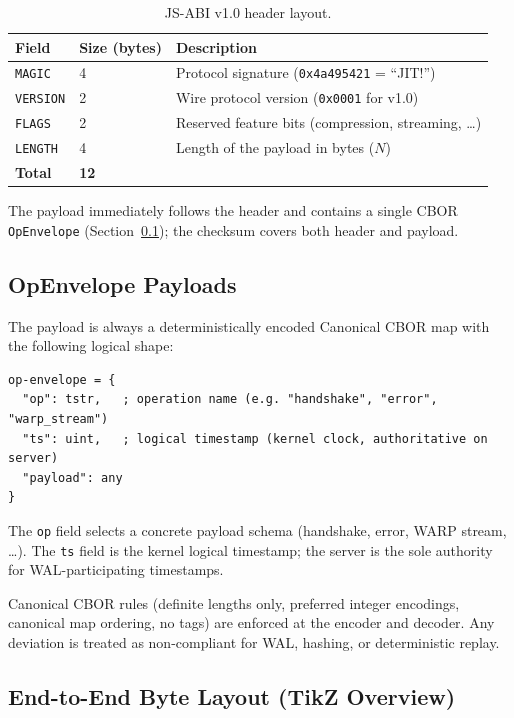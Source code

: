 \begin{table}[h]
  \centering
  \begin{tabular}{@{}lll@{}}
    \toprule
    \textbf{Field} & \textbf{Size (bytes)} & \textbf{Description} \\
    \midrule
    \texttt{MAGIC}   & 4  & Protocol signature (\texttt{0x4a495421} = ``JIT!'') \\
    \texttt{VERSION} & 2  & Wire protocol version (\texttt{0x0001} for v1.0) \\
    \texttt{FLAGS}   & 2  & Reserved feature bits (compression, streaming, \dots) \\
    \texttt{LENGTH}  & 4  & Length of the payload in bytes (\(N\)) \\
    \midrule
    \textbf{Total} & \textbf{12} &  \\
    \bottomrule
  \end{tabular}
  \caption{JS-ABI v1.0 header layout.}
  \label{tab:js-abi-header}
\end{table}

The payload immediately follows the header and contains a single CBOR
\texttt{OpEnvelope} (Section~\ref{sec:js-abi-op-envelope}); the checksum covers
both header and payload.

\subsection{OpEnvelope Payloads}
\label{sec:js-abi-op-envelope}

The payload is always a deterministically encoded Canonical CBOR map with the
following logical shape:

\begin{verbatim}
op-envelope = {
  "op": tstr,   ; operation name (e.g. "handshake", "error", "warp_stream")
  "ts": uint,   ; logical timestamp (kernel clock, authoritative on server)
  "payload": any
}
\end{verbatim}

The \texttt{op} field selects a concrete payload schema (handshake, error,
WARP stream, \dots). The \texttt{ts} field is the kernel logical timestamp; the
server is the sole authority for WAL-participating timestamps.

Canonical CBOR rules (definite lengths only, preferred integer encodings,
canonical map ordering, no tags) are enforced at the encoder and decoder. Any
deviation is treated as non-compliant for WAL, hashing, or deterministic
replay.

\subsection{End-to-End Byte Layout (TikZ Overview)}

